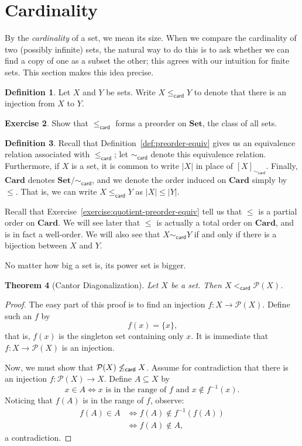 \documentclass[letterpaper]{article}
\newtheorem{theorem}{Theorem}[section]
\theoremstyle{definition}
\newtheorem{definition}[theorem]{Definition}
\newtheorem{exercise}[theorem]{Exercise}
\newcommand{\defterm}{\emph}
\renewcommand{\subset}{\subseteq}
\newcommand{\powerset}{\mathcal{P}}
\newcommand{\inverse}[1]{{#1^{-1}}}
\newcommand{\leqcard}{\mathrel{\leq_\mathsf{card}}}
\newcommand{\ltcard}{\mathrel{<_\mathsf{card}}}
\newcommand{\simcard}{\mathrel{\sim_\mathsf{card}}}
\newcommand{\setclass}{\mathbf{Set}}
\newcommand{\cardclass}{\mathbf{Card}}
\begin{document}
\section{Cardinality}
By the \defterm{cardinality} of a set, we mean its size.  When we
compare the cardinality of two (possibly infinite) sets, the natural
way to do this is to ask whether we can find a copy of one as a subset
the other; this agrees with our intuition for finite sets.  This
section makes this idea precise.

\begin{definition}
  Let \(X\) and \(Y\) be sets.  Write \(X \leqcard Y\) to denote that
  there is an injection from \(X\) to \(Y\).
\end{definition}

\begin{exercise}
  Show that \(\leqcard\) forms a preorder on \(\setclass\), the class
  of all sets.
\end{exercise}

\begin{definition}
  Recall that Definition~\ref{def:preorder-equiv} gives us an
  equivalence relation associated with \(\leqcard\); let \(\simcard\)
  denote this equivalence relation.  Furthermore, if \(X\) is a set,
  it is common to write \(|X|\) in place of \([X]_{\simcard}\).
  Finally, \(\cardclass\) denotes \(\setclass/{\simcard}\), and we
  denote the order induced on \(\cardclass\) simply by \(\leq\).  That
  is, we can write \(X \leqcard Y\) as \(|X| \leq |Y|\).
\end{definition}

Recall that Exercise~\ref{exercise:quotient-preorder-equiv} tell us
that \(\leq\) is a partial order on \(\cardclass\).  We will see later
that \(\leq\) is actually a total order on \(\cardclass\), and is in
fact a well-order.  We will also see that \(X \simcard Y\) if and only
if there is a bijection between \(X\) and \(Y\).

No matter how big a set is, its power set is bigger.
\begin{theorem}[Cantor Diagonalization]
  Let \(X\) be a set.  Then \(X \ltcard \powerset(X)\).
\end{theorem}
\begin{proof}
  The easy part of this proof is to find an injection \(f:X \to
  \powerset(X)\).  Define such an \(f\) by
  \[f(x) = \{x\}\text{,}\]
  that is, \(f(x)\) is the singleton set containing only \(x\).  It is
  immediate that \(f:X \to \powerset(X)\) is an injection.

  Now, we must show that \(\powerset(X) \not\leqcard X\).  Assume for
  contradiction that there is an injection \(f:\powerset(X) \to X\).
  Define \(A \subset X\) by
  \[x \in A \iff x \text{ is in the range of } f \text{ and } x \notin \inverse{f}(x) \text{.}\]
  Noticing that \(f(A)\) is in the range of \(f\), observe:
  \begin{align*}
    f(A) \in A
    &\iff f(A) \notin \inverse{f}(f(A)) \\
    &\iff f(A) \notin A \text{,}
  \end{align*}
  a contradiction.
\end{proof}
\end{document}
